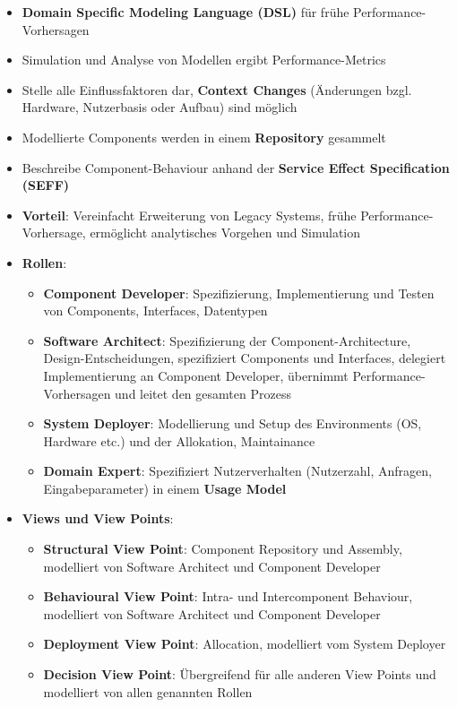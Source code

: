 \begin{itemize}
	\item \textbf{Domain Specific Modeling Language (DSL)} für frühe Performance-Vorhersagen
	\item Simulation und Analyse von Modellen ergibt Performance-Metrics
	\item Stelle alle Einflussfaktoren dar, \textbf{Context Changes} (Änderungen bzgl. Hardware, Nutzerbasis oder Aufbau) sind möglich
	\item Modellierte Components werden in einem \textbf{Repository} gesammelt
	\item Beschreibe Component-Behaviour anhand der \textbf{Service Effect Specification (SEFF)}
	\item \textbf{Vorteil}: Vereinfacht Erweiterung von Legacy Systems, frühe Performance-Vorhersage, ermöglicht analytisches Vorgehen und Simulation
	\item \textbf{Rollen}:
	\begin{itemize}
		\item \textbf{Component Developer}: Spezifizierung, Implementierung und Testen von Components, Interfaces, Datentypen
		\item \textbf{Software Architect}: Spezifizierung der Component-Architecture, Design-Entscheidungen, spezifiziert Components und Interfaces, delegiert Implementierung an Component Developer, übernimmt Performance-Vorhersagen und leitet den gesamten Prozess
		\item \textbf{System Deployer}: Modellierung und Setup des Environments (OS, Hardware etc.) und der Allokation, Maintainance
		\item \textbf{Domain Expert}: Spezifiziert Nutzerverhalten (Nutzerzahl, Anfragen, Eingabeparameter) in einem \textbf{Usage Model}
	\end{itemize}
	\item \textbf{Views und View Points}:
	\begin{itemize}
		\item \textbf{Structural View Point}: Component Repository und Assembly, modelliert von Software Architect und Component Developer
		\item \textbf{Behavioural View Point}: Intra- und Intercomponent Behaviour, modelliert von Software Architect und Component Developer
		\item \textbf{Deployment View Point}: Allocation, modelliert vom System Deployer
		\item \textbf{Decision View Point}: Übergreifend für alle anderen View Points und modelliert von allen genannten Rollen
	\end{itemize}
\end{itemize}